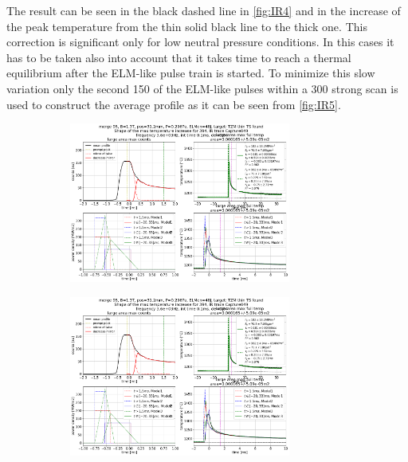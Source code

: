 The result can be seen in the black dashed line in \autoref{fig:IR4} and in the increase of the peak temperature from the thin solid black line to the thick one. This correction is significant only for low neutral pressure conditions. In this cases it has to be taken also into account that it takes time to reach a thermal equilibrium after the ELM-like pulse train is started. To minimize this slow variation only the second 150 of the ELM-like pulses within a 300 strong scan is used to construct the average profile as it can be seen from \autoref{fig:IR5}.

\begin{figure}
     \centering
     \begin{subfigure}{0.7\linewidth}
         \centering
        \hspace*{-5mm}
         \includegraphics[width=0.8\textwidth,trim={510 5 5 415},clip]{Chapters/chapter3/figs/file_index_394_IR_trace_Capture049_43.png}
         \caption{\phantom{ww}}
         \label{fig:IR6a}
     \end{subfigure}
     \hfill
    \begin{subfigure}{0.7\linewidth}
         \centering
         \includegraphics[width=0.8\textwidth,trim={5 5 515 415},clip]{Chapters/chapter3/figs/file_index_394_IR_trace_Capture049_43.png}

\end{subfigure}
\end{figure}
